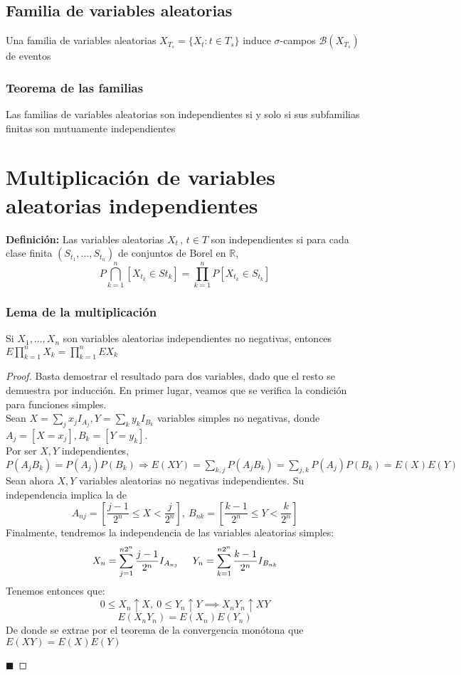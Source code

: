 \documentclass[12pt,a4paper]{book}
\newcommand*{\qed}{\hfill\ensuremath{\blacksquare}}
\begin{document}
\subsection{Familia de variables aleatorias}
Una familia de variables aleatorias $X_{T_s}=\{ X_t : t\in T_s \}$ induce $\sigma$-campos $\mathcal{B}(X_{T_s})$ de eventos
\subsubsection{Teorema de las familias}
\begin{theorem}
Las familias de variables aleatorias son independientes si y solo si sus subfamilias finitas son mutuamente independientes
\end{theorem}
\section{Multiplicación de variables aleatorias independientes}
\textbf{Definición: } Las variables aleatorias $X_t\, , \, t\in T$ son independientes si para cada clase finita $(S_{t_1},\ldots , S_{t_n})$ de conjuntos de Borel en $\mathbb{R}$,
$$P\bigcap_{k=1}^{n}[X_{t_k}\in S{t_k}]=\displaystyle\prod_{k=1}^n P[X_{t_k}\in S_{t_k}]$$

\subsubsection{Lema de la multiplicación}
\begin{lemma}
Si $X_1, \ldots , X_n$ son variables aleatorias independientes no negativas, entonces $E\displaystyle\prod_{k=1}^{n}X_k=\displaystyle\prod_{k=1}^{n} E X_k$
\end{lemma}
\begin{proof}
Basta demostrar el resultado para dos variables, dado que el resto se demuestra por inducción. En primer lugar, veamos que se verifica la condición para funciones simples.\\

Sean $X = \sum_j x_j I_{A_j}, Y = \sum_k y_k I_{B_k}$ variables simples no negativas, donde $A_j = [X = x_j], B_k = [Y = y_k]$.\\

Por ser $X,Y$ independientes, $P(A_jB_k) = P(A_j)P(B_k) \Rightarrow E(XY) = \sum_{k,j} P(A_jB_k) = \sum_{j,k} P(A_j)P(B_k) = E(X)E(Y)$\\

Sean ahora $X,Y$ variables aleatorias no negativas independientes. 
Su independencia implica la de
$$ A_{nj} = \left[\frac{j-1}{2^n} \leq X < \frac{j}{2^n}\right],\  B_{nk} = \left[\frac{k-1}{2^n} \leq Y < \frac{k}{2^n}\right]$$
Finalmente, tendremos la independencia de las variables aleatorias simples:
$$ X_n = \sum_{j=1}^{n2^n} \frac {j-1}{2^n}I_{A_{nj}}\hspace{0.5cm} Y_n = \sum_{k=1}^{n2^n} \frac {k-1}{2^n}I_{B_{nk}}$$
Tenemos entonces que:
$$ 0 \leq X_n \uparrow X, \ 0 \leq Y_n \uparrow Y \implies X_nY_n \uparrow XY$$
$$ E(X_nY_n) = E(X_n)E(Y_n)$$
De donde se extrae por el teorema de la convergencia monótona que $E(XY) = E(X)E(Y)$

\qed
\end{proof}
\end{document}

